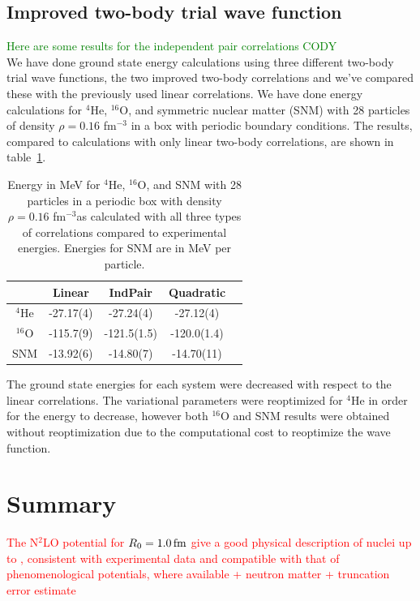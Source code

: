 \documentclass[aps,prc,twocolumn,superscriptaddress,showpacs,floatfix,nofootinbib]{revtex4-1}
\newcommand{\red}[1]{\protect\textcolor{red}{#1}}
\newcommand{\green}[1]{\protect\textcolor{green}{#1}}
\begin{document}
\subsection{Improved two-body trial wave function}
\green{Here are some results for the independent pair correlations CODY \\}
We have done ground state energy calculations using three different two-body trial wave functions, the two improved two-body correlations and we've compared these with the previously used linear correlations. We have done energy calculations for $^4$He, $^{16}$O, and symmetric nuclear matter (SNM) with 28 particles of density $\rho=0.16$ fm$^{-3}$ in a box with periodic boundary conditions. The results, compared to calculations with only linear two-body correlations, are shown in table~\ref{tab:indpairresults}.
\begin{table}[h!]
   \centering
   \caption{Energy in MeV for $^4$He, $^{16}$O, and SNM with 28 particles in a periodic box with density $\rho=0.16$ fm$^{-3}$as calculated with all three types of correlations compared to experimental energies. Energies for SNM are in MeV per particle.}
   \label{tab:indpairresults}
   \begin{tabular}{ccccc}
      \hline \hline
       & Linear & IndPair & Quadratic \\
      \hline
      $^4$He & -27.17(4) & -27.24(4) & -27.12(4) \\
      $^{16}$O & -115.7(9) & -121.5(1.5) & -120.0(1.4) \\
      SNM & -13.92(6) & -14.80(7) & -14.70(11) \\
      \hline \hline
   \end{tabular}
\end{table}
The ground state energies for each system were decreased with respect to the linear correlations. The variational parameters were reoptimized for $^4$He in order for the energy to decrease, however both $^{16}$O and SNM results were obtained without reoptimization due to the computational cost to reoptimize the wave function.



\section{Summary}
\label{sec:summ}

\red{The N$^2$LO potential for $R_0=1.0\,\rm fm$ give a good physical description 
of nuclei up to \isotope[16]{O}, consistent with experimental data and compatible 
with that of phenomenological potentials, where available
+ neutron matter
+ truncation error estimate}
\end{document}
